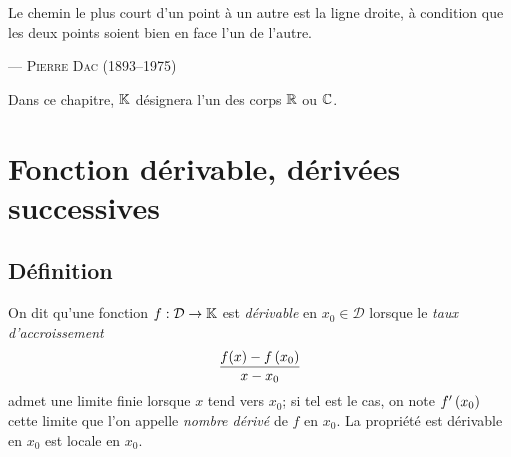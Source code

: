 \documentclass{magnoliaold}
\begin{document}
\setlength{}
\epigraph{\og Le chemin le plus court d'un point à un autre est la ligne droite, à condition que les deux points soient bien en face l'un de l'autre.\fg}{--- \textsc{Pierre Dac (1893--1975)}}

\magtoc
\vspace{2ex}
Dans ce chapitre, $\mathbb{K}$ désignera l'un des corps $\mathbb{R}$ ou $\mathbb{C}$.

\section{Fonction dérivable, dérivées successives}
\subsection{Définition}

\begin{definition}[utile=-3]
On dit qu'une fonction $f:\mathcal{D}\to\mathbb{K}$ est \emph{dérivable} en $x_0\in\mathcal{D}$ lorsque le
\emph{taux d'accroissement}
\[\frac{f(x)-f\left(x_0\right)}{x-x_0}\]
admet une limite finie lorsque $x$ tend vers $x_0$; si tel est le cas, on note
$f'\left(x_0\right)$ cette limite que l'on appelle \emph{nombre dérivé} de $f$ en $x_0$.
La propriété \og est dérivable en $x_0$ \fg est locale en $x_0$.
\end{definition}

\end{document}
